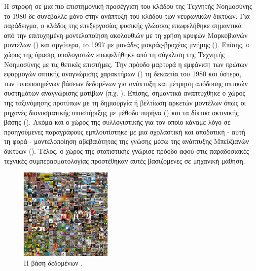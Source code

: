 Η στροφή σε μια πιο επιστημονική προσέγγιση του κλάδου της Τεχνητής Νοημοσύνης το 1980 δε συνέβαλλε μόνο στην ανάπτυξη του κλάδου των νευρωνικών δικτύων. Για παράδειγμα, ο κλάδος της επεξεργασίας φυσικής γλώσσας επωφελήθηκε σημαντικά από την επιτυχημένη μοντελοποίηση ακολουθιών με τη χρήση κρυφών Μαρκοβιανών μοντέλων () και αργότερα, τo 1997 με μονάδες μακράς-βραχέας μνήμης (). Επίσης, ο χώρος της όρασης υπολογιστών επωφελήθηκε από τη σύγκλιση της Τεχνητής Νοημοσύνης με τις θετικές επιστήμες. Την πρόοδο μαρτυρά η εμφάνιση των πρώτων εφαρμογών οπτικής αναγνώρισης χαρακτήρων () τη δεκαετία του 1980 και ύστερα, των τυποποιημένων βάσεων δεδομένων για ανάπτυξη και μέτρηση απόδοσης οπτικών συστημάτων αναγνώρισης μοτίβων (π.χ. \cite{lecun1998gradientMNIST}). Επίσης, σημαντικά αναπτύχθηκε ο χώρος της ταξινόμησης προτύπων με τη δημιουργία ή βελτίωση αρκετών μοντέλων όπως οι μηχανές διανυσματικής υποστήριξης με μέθοδο πυρήνα () και τα δίκτυα ακτινικής βάσης (). Ακόμα και ο χώρος της συλλογιστικής για τον οποίο κάναμε λόγο σε προηγούμενες παραγράφους εμπλουτίστηκε με μια σχολαστική και αποδοτική - αυτή τη φορά - μοντελοποίηση αβεβαιότητας της γνώσης μέσω της ανάπτυξης Μπεϋζιανών δικτύων (). Τέλος, ο χώρος της στατιστικής γνώρισε πρόοδο αφού στις παραδοσιακές τεχνικές συμπερασματολογίας προστέθηκαν αυτές βασιζόμενες σε μηχανική μάθηση.
\par
\begin{figure}
  \begin{center}
    \includegraphics[width=0.40\textwidth]{images/introduction/imagenet.jpg}
  \end{center}
  \caption{Η βάση δεδομένων .}
\end{figure}
